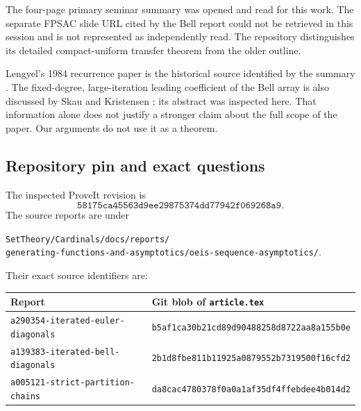 \documentclass[11pt,letterpaper]{article}
\theoremstyle{remark}\newtheorem{remark}[theorem]{Remark}
\newcommand{\file}[1]{\nolinkurl{#1}}
\newcommand{\Repin}{\texttt{58175ca45563d9ee29875374dd77942f069268a9}}
\begin{document}
The four-page primary seminar summary was opened and read for this
work. The separate FPSAC slide URL cited by the Bell report could not
be retrieved in this session and is not represented as independently
read. The repository distinguishes its detailed compact-uniform
transfer theorem from the older outline.

Lengyel's 1984 recurrence paper is the historical source identified
by the summary \cite{Lengyel}. The fixed-degree, large-iteration
leading coefficient of the Bell array is also discussed by Skau and
Kristensen \cite{Skau}; its abstract was inspected here. That
information alone does not justify a stronger claim about the full
scope of the paper. Our arguments do not use it as a theorem.

\subsection{Repository pin and exact questions}
The inspected ProveIt revision is
\[
 \Repin.
\]
The source reports are under
\begin{center}\small
\file{SetTheory/Cardinals/docs/reports/}\\
\file{generating-functions-and-asymptotics/oeis-sequence-asymptotics/}.
\end{center}
Their exact source identifiers are:
\begin{center}\small
\begin{tabular}{@{}p{}p{}@{}}
\toprule
Report & Git blob of \file{article.tex}\\
\midrule
\file{a290354-iterated-euler-diagonals}
 & \nolinkurl{b5af1ca30b21cd89d90488258d8722aa8a155b0e}\\
\file{a139383-iterated-bell-diagonals}
 & \nolinkurl{2b1d8fbe811b11925a0879552b7319500f16cfd2}\\
\file{a005121-strict-partition-chains}
 & \nolinkurl{da8cac4780378f0a0a1af35df4ffebdee4b014d2}\\
\bottomrule
\end{tabular}
\end{center}
\end{document}
